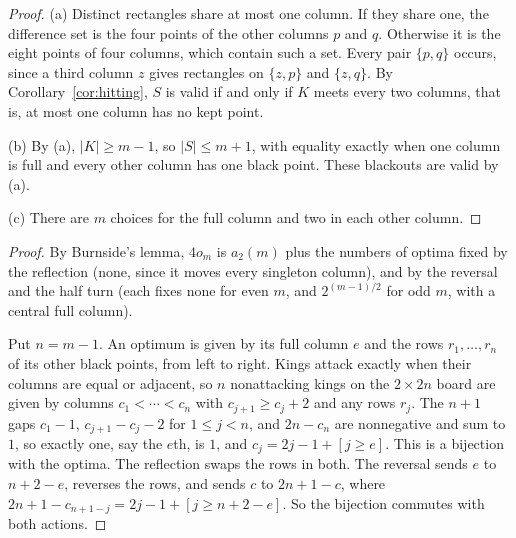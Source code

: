 
\begin{proof}
(a) Distinct rectangles share at most one column. If they share one, the difference
set is the four points of the other columns $p$ and $q$. Otherwise it is the eight points
of four columns, which contain such a set. Every pair $\{p,q\}$ occurs, since a
third column $z$ gives rectangles on $\{z,p\}$ and $\{z,q\}$. By
Corollary~\ref{cor:hitting}, $S$ is valid if and only if $K$ meets every two columns,
that is, at most one column has no kept point.

(b) By (a), $|K|\ge m-1$, so $|S|\le m+1$, with equality exactly when one column is full
and every other column has one black point. These blackouts are valid by (a).

(c) There are $m$ choices for the full column and two in each other column.
\end{proof}

\begin{proof}
By Burnside's lemma, $4o_m$ is $a_2(m)$ plus the numbers of optima fixed by the
reflection (none, since it moves every singleton column), and by the reversal and the
half turn (each fixes none for even $m$, and $2^{(m-1)/2}$ for odd $m$, with a central full
column).

Put $n=m-1$. An optimum is given by its full column $e$ and the rows $r_1,\ldots,r_n$ of
its other black points, from left to right. Kings attack exactly when their columns are
equal or adjacent, so $n$ nonattacking kings on the $2\times2n$ board are given by
columns $c_1<\cdots<c_n$ with $c_{j+1}\ge c_j+2$ and any rows $r_j$. The $n+1$ gaps $c_1-1$,
$c_{j+1}-c_j-2$ for $1\le j<n$, and $2n-c_n$ are nonnegative and sum to $1$, so exactly one, say the
$e$th, is $1$, and $c_j=2j-1+[j\ge e]$. This is a bijection with the optima. The
reflection swaps the rows in both. The reversal sends $e$ to $n+2-e$, reverses
the rows, and sends $c$ to $2n+1-c$, where $2n+1-c_{n+1-j}=2j-1+[j\ge n+2-e]$. So the
bijection commutes with both actions.
\end{proof}
